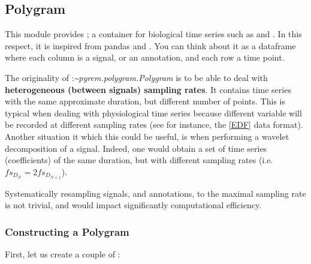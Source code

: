 \documentclass[letterpaper,10pt,english]{sphinxmanual}
\begin{document}
\subsection{Polygram}
\label{pyrem.polygram:polygram}
This module provides {\hyperref[pyrem.polygram:pyrem.polygram.Polygram]{}}; a container for biological time series
such as {\hyperref[pyrem.time_series:pyrem.time_series.Signal]{}} and {\hyperref[pyrem.time_series:pyrem.time_series.Annotation]{}}.
In this respect, it is inspired from pandas  and \href{http://pandas.pydata.org/pandas-docs/stable/generated/pandas.DataFrame.html\#pandas.DataFrame}{}.
You can think about it as a dataframe where each column is a signal, or an annotation, and each row a time point.

The originality of :\emph{\textasciitilde{}pyrem.polygram.Polygram} is to be able to deal with \textbf{heterogeneous (between signals) sampling rates}.
It contains time series with the same approximate duration, but different number of points.
This is typical when dealing with physiological time series because different variable will be
recorded at different sampling rates (see for instance, the {\hyperref[pyrem.polygram:edf]{{[}EDF{]}}} data format).
Another situation it which this could  be useful, is when performing a wavelet decomposition of a signal.
Indeed, one would obtain a set of time series (coefficients) of the same duration, but with different sampling rates (i.e. \(fs_{D_N} = 2fs_{D_{N+1}}\)).

Systematically resampling signals, and annotations, to the maximal sampling rate is not  trivial, and would impact
significantly computational efficiency.


\subsubsection{Constructing a Polygram}
\label{pyrem.polygram:constructing-a-polygram}
First, let us create a couple of :
\end{document}
